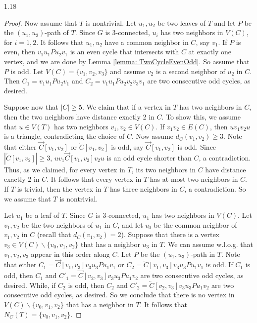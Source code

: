 \documentclass[10pt]{article}
\begin{document}
\begin{spacing}{1.18}
\begin{proof}
    Now assume that $T$ is nontrivial. Let $u_1,u_2$ be two leaves of $T$ and let $P$ be the $(u_1,u_2)$-path of $T$. Since $G$ is 3-connected, $u_i$ has two neighbors in $V(C)$, for $i=1,2$. It follows that $u_1,u_2$ have a common neighbor in $C$, say $v_1$. If $P$ is even, then $v_1u_1Pu_2v_1$ is an even cycle that intersects with $C$ at exactly one vertex, and we are done by Lemma \ref{lemma: TwoCycleEvenOdd}. So assume that $P$ is odd. Let $V(C)=\{v_1,v_2,v_3\}$ and assume $v_2$ is a second neighbor of $u_2$ in $C$. Then $C_1=v_1u_1Pu_2v_1$ and $C_2=v_1u_1Pu_2v_2v_3v_1$ are two consecutive odd cycles, as desired.

    Suppose now that $|C|\geqslant 5$. We claim that if a vertex in $T$ has two neighbors in $C$, then the two neighbors have distance exactly 2 in $C$. To show this, we assume that $u\in V(T)$ has two neighbors $v_1,v_2\in V(C)$. If $v_1v_2\in E(C)$, then $uv_1v_2u$ is a triangle, contradicting the choice of $C$. Now assume $d_C(v_1,v_2)\geqslant 3$. Note that either $\overrightarrow{C}[v_1,v_2]$ or $\overleftarrow{C}[v_1,v_2]$ is odd, say $\overrightarrow{C}[v_1,v_2]$ is odd. Since $|\overleftarrow{C}[v_1,v_2]|\geqslant 3$, $uv_1\overrightarrow{C}[v_1,v_2]v_2u$ is an odd cycle shorter than $C$, a contradiction. Thus, as we claimed, for every vertex in $T$, its two neighbors in $C$ have distance exactly 2 in $C$. It follows that every vertex in $T$ has at most two neighbors in $C$.
    If $T$ is trivial, then the vertex in $T$ has three neighbors in $C$, a contradiction. So we assume that $T$ is nontrivial. 
    
    Let $u_1$ be a leaf of $T$. Since $G$ is 3-connected, $u_1$ has two neighbors in $V(C)$. Let $v_1,v_2$ be the two neighbors of $u_1$ in $C$, and let $v_0$ be the common neighbor of $v_1,v_2$ in $C$ (recall that $d_C(v_1,v_2)=2$). Suppose that there is a vertex $v_3\in V(C)\backslash\{v_0,v_1,v_2\}$ that has a neighbor $u_3$ in $T$. We can assume w.l.o.g. that $v_1,v_2,v_3$ appear in this order along $C$. Let $P$ be the $(u_1,u_3)$-path in $T$. Note that either $C_1=\overrightarrow{C}[v_1,v_3]v_3u_3Pu_1v_1$ or $C_2=\overleftarrow{C}[v_1,v_3]v_3u_3Pu_1v_1$ is odd. If $C_1$ is odd, then $C_1$ and $C'_1=\overrightarrow{C}[v_2,v_3]v_3u_3Pu_1v_2$ are two consecutive odd cycles, as desired. While, if $C_2$ is odd, then $C_2$ and $C'_2=\overleftarrow{C}[v_2,v_3]v_3u_3Pu_1v_2$ are two consecutive odd cycles, as desired. So we conclude that there is no vertex in $V(C)\backslash\{v_0,v_1,v_2\}$ that has a neighbor in $T$. It follows that $N_C(T)=\{v_0,v_1,v_2\}$.


\end{proof}
\end{spacing}
\end{document}
